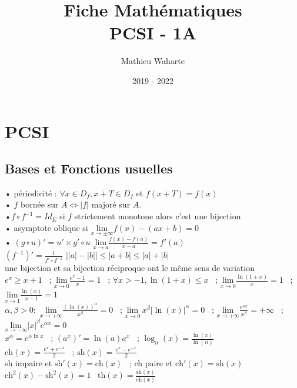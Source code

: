 \documentclass[12 pt]{exampleclass}
\title{Fiche Mathématiques \\ PCSI - 1A}
\author{Mathieu Waharte}
\date{2019 - 2022}
\begin{document}
\maketitle

\chapter{PCSI}
\section{Bases et Fonctions usuelles} 

\begin{flushleft}
\begin{doublespace}
	• périodicité : $\forall x \in D_f, x+T \in D_f$ et $ f(x+T)=f(x)$ \\
	• $f$ bornée sur $A \Leftrightarrow |f|$ majoré sur $A$.\\
	•$f\circ f^{-1}=Id_E$ si $f$ strictement monotone alors c'est une bijection \\
	• asymptote oblique si $\underset{x \rightarrow \pm \infty}{\text{lim}} f(x)-(ax+b)=0$ \\
	• $(g\circ u)'=u' \times g'\circ u$ \quad $\underset{x \rightarrow a}{\text{lim}} \frac{f(x)-f(a)}{x-a} = f'(a)$ \\
	$(f^{-1})'=\frac{1}{f'\circ f^{-1}}$ \quad $\Big| |a|-|b| \Big| \leq |a+b| \leq |a|+|b|$ \\
	une bijection et sa bijection réciproque ont le même sens de variation \\
	$e^x \geq x+1$ \ ;  $\underset{x \rightarrow 0}{\text{lim}} \frac{e^x -1}{x} = 1$ \ ;  $\forall x> -1, \ln(1+x) \leq x$ \ ;  $\underset{x \rightarrow 0}{\text{lim}} \frac{\ln(1+x)}{x} = 1$ \ ;  $\underset{x \rightarrow 1}{\text{lim}} \frac{\ln(x)}{x-1} = 1$ \\
	$\alpha , \beta > 0 :$ $\underset{x \rightarrow + \infty}{\text{lim}} \frac{(\ln(x))^\alpha}{x^\beta} = 0$ \ ;  $\underset{x \rightarrow 0}{\text{lim}}\ x^\beta \big| \ln(x) \big|^\alpha = 0 $ \ ; $\underset{x \rightarrow + \infty}{\text{lim}} \frac{e^{\alpha x}}{x^\beta} = + \infty$ \ ; $\underset{x \rightarrow - \infty}{\text{lim}} |x|^\beta e^{\alpha x} = 0$ \\
	$x^\alpha = e^{\alpha \ln x}$ \ ; $(a^x)' = \ln(a) a^x$ \ ; $\log_n(x) = \frac{\ln(x)}{\ln(n)}$ \\
	$\text{ch}(x) = \frac{e^x + e^{-x}}{2}$ \ ; $\text{sh}(x) = \frac{e^x - e^{-x}}{2}$ \\
	sh impaire et $\text{sh}'(x)=\text{ch}(x)$ \ ; ch paire et $\text{ch}'(x)=\text{sh}(x)$ \ $\text{ch}^2(x) - \text{sh}^2(x) = 1$ \ $\text{th}(x) = \frac{\text{sh}(x)}{\text{ch}(x)}$ \\ 
	

\end{doublespace}
\end{flushleft}
\end{document}

